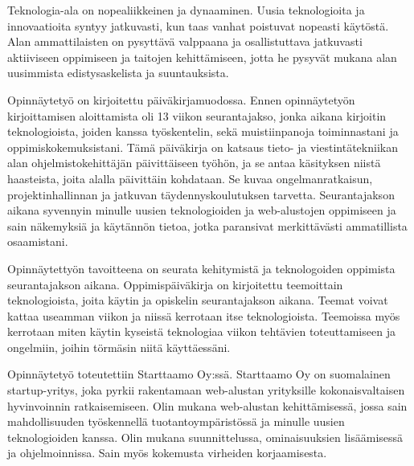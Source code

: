 \documentclass[11pt,a4paper,titlepage,oneside]{article}
\begin{document}

Teknologia-ala on nopealiikkeinen ja dynaaminen. 
Uusia teknologioita ja innovaatioita syntyy jatkuvasti, kun taas vanhat poistuvat nopeasti käytöstä.
Alan ammattilaisten on pysyttävä valppaana ja osallistuttava jatkuvasti aktiiviseen oppimiseen ja taitojen kehittämiseen,
jotta he pysyvät mukana alan uusimmista edistysaskelista ja suuntauksista.
\medskip




Opinnäytetyö on kirjoitettu päiväkirjamuodossa. 
Ennen opinnäytetyön kirjoittamisen aloittamista oli 13 viikon seurantajakso, jonka aikana kirjoitin teknologioista,
joiden kanssa työskentelin, sekä muistiinpanoja toiminnastani ja oppimiskokemuksistani.
Tämä päiväkirja on katsaus tieto- ja viestintätekniikan alan ohjelmistokehittäjän päivittäiseen työhön,
ja se antaa käsityksen niistä haasteista, joita alalla päivittäin kohdataan.
Se kuvaa ongelmanratkaisun, projektinhallinnan ja jatkuvan täydennyskoulutuksen tarvetta.
Seurantajakson aikana syvennyin minulle uusien teknologioiden ja web-alustojen oppimiseen ja sain näkemyksiä ja käytännön tietoa,
jotka paransivat merkittävästi ammatillista osaamistani.
\medskip



% 
Opinnäytettyön tavoitteena on seurata kehitymistä ja teknologoiden oppimista seurantajakson aikana.
% 
Oppimispäiväkirja on kirjoitettu teemoittain teknologioista, joita käytin ja opiskelin seurantajakson aikana.
Teemat voivat kattaa useamman viikon ja niissä kerrotaan itse teknologioista. 
Teemoissa myös kerrotaan miten käytin kyseistä teknologiaa viikon tehtävien toteuttamiseen ja
ongelmiin, joihin törmäsin niitä käyttäessäni.
\medskip






Opinnäytetyö toteutettiin Starttaamo Oy:ssä. Starttaamo Oy on suomalainen startup-yritys,
 joka pyrkii rakentamaan web-alustan yrityksille kokonaisvaltaisen hyvinvoinnin ratkaisemiseen.
%
% 
%
Olin mukana web-alustan kehittämisessä, jossa
%
sain mahdollisuuden työskennellä tuotantoympäristössä ja minulle uusien teknologioiden kanssa.
Olin mukana suunnittelussa, ominaisuuksien lisäämisessä ja ohjelmoinnissa. 
Sain myös kokemusta virheiden korjaamisesta.
\end{document}
